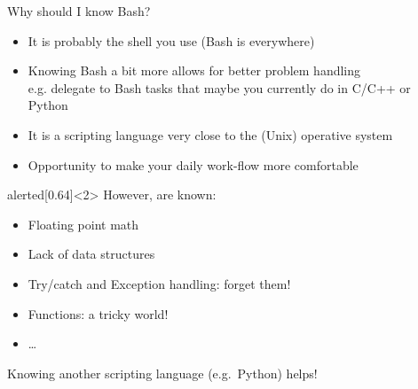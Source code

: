 \begin{frame}{Why should I know Bash?}%
    \vspace{-3mm}
    \begin{itemize}
        \item It is probably the shell you use (Bash is everywhere)
        \item Knowing Bash a bit more allows for better problem handling \\
              \then e.g. delegate to Bash tasks that maybe you currently do in C/C++ or Python
        \item It is a scripting language very close to the (Unix) operative system
        \item Opportunity to make your daily work-flow more comfortable
    \end{itemize}
    \PrepareURLsymbol[ALERT]
    \begin{varblock}{alerted}[0.64\textwidth]{}<2>
        However,  are known:\hfill
        \begin{itemize}
            \item Floating point math
            \item Lack of data structures
            \item Try/catch and Exception handling: forget them!
            \item Functions: a tricky world!
            \item \ldots
        \end{itemize}
        Knowing another scripting language (e.g.\ Python) helps!
    \end{varblock}
\end{frame}
